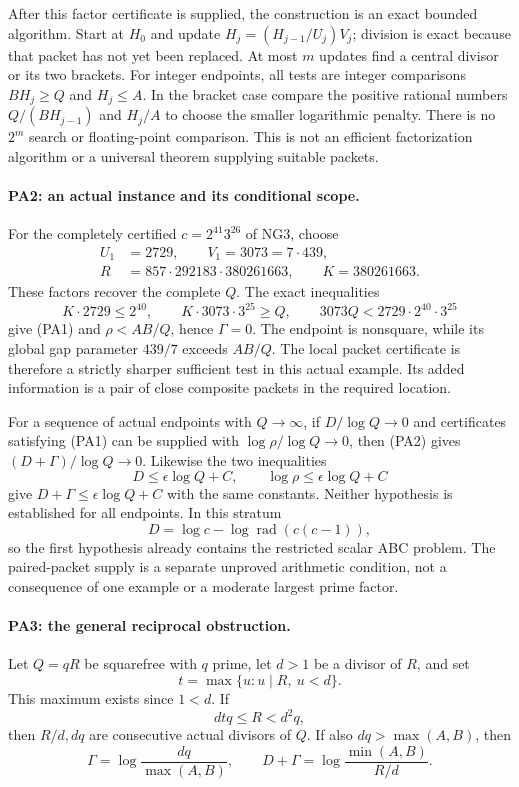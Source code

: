 After this factor certificate is supplied, the construction is an
exact bounded algorithm. Start at $H_0$ and update
$H_j=(H_{j-1}/U_j)V_j$; division is exact because that packet has
not yet been replaced. At most $m$ updates find a central divisor
or its two brackets. For integer endpoints, all tests are integer
comparisons $BH_j\geq Q$ and $H_j\leq A$. In the bracket case
compare the positive rational numbers $Q/(BH_{j-1})$ and $H_j/A$
to choose the smaller logarithmic penalty. There is no $2^m$ search
or floating-point comparison. This is not an efficient factorization
algorithm or a universal theorem supplying suitable packets.

\paragraph{PA2: an actual instance and its conditional scope.}
For the completely certified $c=2^{41}3^{26}$ of NG3, choose
\[
 \begin{split}
 U_1&=2729,\qquad V_1=3073=7\cdot439,\\
 R&=857\cdot292183\cdot380261663,\qquad K=380261663.
 \end{split}
\]
These factors recover the complete $Q$. The exact inequalities
\[
 K\cdot2729\leq2^{40},\qquad K\cdot3073\cdot3^{25}\geq Q,
 \qquad 3073Q<2729\cdot2^{40}\cdot3^{25}
\]
give (PA1) and $\rho<AB/Q$, hence $\Gamma=0$. The endpoint is
nonsquare, while its global gap parameter $439/7$ exceeds $AB/Q$.
The local packet certificate is therefore a strictly sharper
sufficient test in this actual example. Its added information is a
pair of close composite packets in the required location.

For a sequence of actual endpoints with $Q\to\infty$, if
$D/\log Q\to0$ and certificates satisfying (PA1) can be supplied
with $\log\rho/\log Q\to0$, then (PA2) gives
$(D+\Gamma)/\log Q\to0$. Likewise the two inequalities
\[
 D\leq\epsilon\log Q+C,\qquad
 \log\rho\leq\epsilon\log Q+C
\]
give $D+\Gamma\leq\epsilon\log Q+C$ with the same constants.
Neither hypothesis is established for all endpoints. In this
stratum
\[
 D=\log c-\log\operatorname{rad}(c(c-1)),
\]
so the first hypothesis already contains the restricted scalar ABC
problem. The paired-packet supply is a separate unproved arithmetic
condition, not a consequence of one example or a moderate largest
prime factor.

\paragraph{PA3: the general reciprocal obstruction.}
Let $Q=qR$ be squarefree with $q$ prime, let $d>1$ be a divisor of
$R$, and set
\[
 t=\max\{u:u\mid R,\ u<d\}.
\]
This maximum exists since $1<d$. If
\[
 dtq\leq R<d^2q,                                    \tag{PA3}
\]
then $R/d,dq$ are consecutive actual divisors of $Q$. If also
$dq>\max(A,B)$, then
\[
 \Gamma=\log\frac{dq}{\max(A,B)},\qquad
 D+\Gamma=\log\frac{\min(A,B)}{R/d}.                 \tag{PA4}
\]

